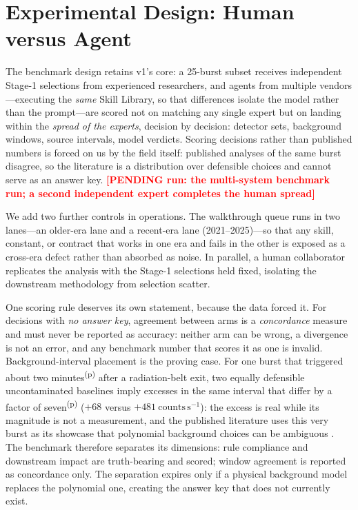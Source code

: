 \documentclass[twocolumn]{aastex631}
\newcommand{\PENDING}[1]{\textbf{\textcolor{red}{[PENDING run: #1]}}}
\newcommand{\prov}{\textsuperscript{(p)}}   %
\begin{document}
\section{Experimental Design: Human versus Agent} \label{sec:design}
The benchmark design retains v1's core: a 25-burst subset receives
independent Stage-1 selections from experienced researchers, and agents from
multiple vendors---executing the \emph{same} Skill Library, so that
differences isolate the model rather than the prompt---are scored not on
matching any single expert but on landing within the \emph{spread of the
experts}, decision by decision: detector sets, background windows, source
intervals, model verdicts. Scoring decisions rather than published numbers
is forced on us by the field itself: published analyses of the same burst
disagree, so the literature is a distribution over defensible choices and
cannot serve as an answer key. \PENDING{the multi-system benchmark run; a
second independent expert completes the human spread}

We add two further controls in operations. The walkthrough queue runs in two
lanes---an older-era lane and a recent-era lane (2021--2025)---so that any
skill, constant, or contract that works in one era and fails in the other
is exposed as a cross-era defect rather than absorbed as noise. In
parallel, a human collaborator replicates the analysis with the Stage-1
selections held fixed, isolating the downstream methodology from
selection scatter.

One scoring rule deserves its own statement, because the data forced it.
For decisions with \emph{no answer key}, agreement between arms is a
\emph{concordance} measure and must never be reported as accuracy:
neither arm can be wrong, a divergence is not an error, and any benchmark
number that scores it as one is invalid. Background-interval placement is
the proving case. For one burst that triggered about two minutes\prov{}
after a radiation-belt exit, two equally defensible uncontaminated
baselines imply excesses in the same interval that differ by a factor of
seven\prov{} ($+68$ versus $+481~\mathrm{counts\,s^{-1}}$): the excess is
real while its magnitude is not a measurement, and the published
literature uses this very burst as its showcase that polynomial
background choices can be ambiguous \citep{2020A&A...640A...8B}. The
benchmark therefore separates its dimensions: rule compliance and
downstream impact are truth-bearing and scored; window agreement is
reported as concordance only. The separation expires only if a physical
background model replaces the polynomial one, creating the answer key
that does not currently exist.
\end{document}
